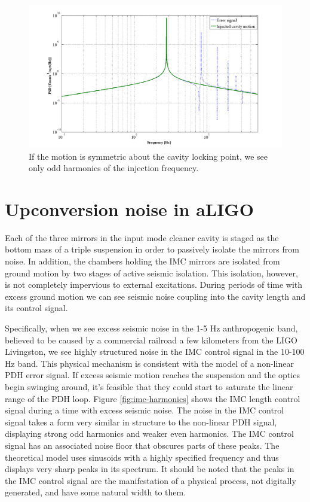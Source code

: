 \begin{figure}[h!]
\includegraphics[height=0.6\textwidth]{figures/IMCUpconversion/symmetric_PDH.png}
\caption[PDH response to symmetric cavity motion]{If the motion is symmetric about the cavity locking point, we see only odd harmonics of the injection frequency.}
\label{fig:symmetric-pdh}
\end{figure}

\section{Upconversion noise in aLIGO}
Each of the three mirrors in the input mode cleaner cavity is staged as the bottom 
mass of a triple suspension in order to passively isolate the mirrors from noise. 
In addition, the chambers holding the IMC mirrors are isolated from ground motion by 
two stages of active seismic isolation. This isolation, however, is not completely 
impervious to external excitations. During periods of time with excess ground motion 
we can see seismic noise coupling into the cavity length and its control signal.

Specifically, when we see excess seismic noise in the 1-5 Hz anthropogenic band, 
believed to be caused by a commercial railroad a few kilometers from the LIGO 
Livingston, we see highly structured noise in the IMC control signal in the 10-100 Hz 
band. This physical mechanism is consistent with the model of a non-linear PDH error 
signal. If excess seismic motion reaches the suspension and the optics begin swinging 
around, it's feasible that they could start to saturate the linear range of the PDH loop.
Figure \ref{fig:imc-harmonics} shows the IMC length control signal during a time 
with excess seismic noise. 
The noise in the IMC control signal 
takes a form very similar in structure to the non-linear PDH signal, displaying 
strong odd harmonics and weaker even harmonics. The IMC control signal has an associated 
noise floor that obscures parts of these peaks. The theoretical model uses sinusoids with 
a highly specified frequency and thus displays very sharp peaks in its spectrum. 
It should be noted that the peaks in the IMC control signal are the manifestation of 
a physical process, not digitally generated, and have some natural width to them.

